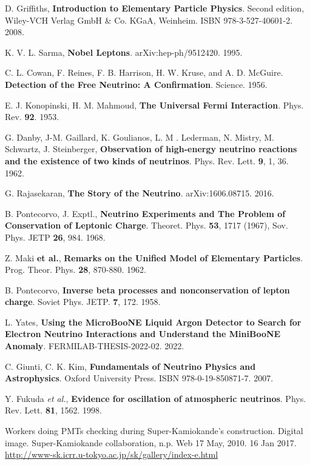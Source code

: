  D. Griffiths, \textbf{Introduction to Elementary Particle Physics}. Second edition, Wiley-VCH Verlag GmbH \& Co. KGaA, Weinheim. ISBN 978-3-527-40601-2. 2008.

 K. V. L. Sarma, \textbf{Nobel Leptons}. arXiv:hep-ph/9512420. 1995.

 C. L. Cowan, F. Reines, F. B. Harrison, H. W. Kruse, and A. D. McGuire. \textbf{Detection of the Free Neutrino: A Confirmation}. Science. 1956.

 E. J. Konopinski, H. M. Mahmoud, \textbf{The Universal Fermi Interaction}. Phys. Rev. \textbf{92}. 1953.

 G. Danby, J-M. Gaillard, K. Goulianos, L. M . Lederman, N. Mistry, M. Schwartz, J. Steinberger, \textbf{Observation of high-energy neutrino reactions and the existence of two kinds of neutrinos}. Phys. Rev. Lett. \textbf{9}, 1, 36. 1962.

 G. Rajasekaran, \textbf{The Story of the Neutrino}. arXiv:1606.08715. 2016.

 B. Pontecorvo, J. Exptl., \textbf{Neutrino Experiments and The Problem of Conservation of Leptonic Charge}. Theoret. Phys. \textbf{53}, 1717 (1967), Sov. Phys. JETP \textbf{26}, 984. 1968.

 Z. Maki \textbf{et al.}, \textbf{Remarks on the Unified Model of Elementary Particles}. Prog. Theor. Phys. \textbf{28}, 870-880. 1962.

 B. Pontecorvo, \textbf{Inverse beta processes and nonconservation of lepton charge}. Soviet Phys. JETP. \textbf{7}, 172. 1958.

 L. Yates, \textbf{Using the MicroBooNE Liquid Argon Detector
to Search for Electron Neutrino Interactions and Understand the MiniBooNE Anomaly}. FERMILAB-THESIS-2022-02. 2022.

 C. Giunti, C. K. Kim, \textbf{Fundamentals of Neutrino Physics and Astrophysics}. Oxford University Press. ISBN 978-0-19-850871-7. 2007.

 Y. Fukuda \textit{et al.}, \textbf{Evidence for oscillation of atmospheric neutrinos}. Phys. Rev. Lett. \textbf{81}, 1562. 1998. 

 Workers doing PMTs checking during Super-Kamiokande's construction. Digital image. Super-Kamiokande collaboration, n.p. Web 17 May, 2010. 16 Jan 2017. \href{http://www-sk.icrr.u-tokyo.ac.jp/sk/gallery/index-e.html}{http://www-sk.icrr.u-tokyo.ac.jp/sk/gallery/index-e.html}

